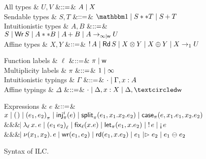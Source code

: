 \begin{figure*}[t]
  \centering
  \begin{minipage}{.58\textwidth}
    \centering
    \begin{grammar}
        All types
      & $U, V$
        &$\bnfas$& $A \bnfalt X$
      \\
      Sendable types
      & $S, T$
      &$\bnfas$& $\tyUnit \bnfalt S ** T \bnfalt \tySum{S}{}{T}$
      \\
      Intuitionistic types
      & $A,B$
      &$\bnfas$& $S \bnfalt \tyWr{S} \bnfalt A ** B \bnfalt \tySum{A}{}{B}
      \bnfalt \tyArr{A}{\infty \mid \wm}{U}$
      \\
      Affine types
      & $X,Y$
      &$\bnfas$& $\tyBang{A} \bnfalt \tyRd{S} \bnfalt \tyTensor{X}{Y} \bnfalt
      \tyOplus{X}{Y} \bnfalt \tyArr{X}{1}{U}$
    \end{grammar}      
  \end{minipage}%
  \begin{minipage}{.42\textwidth}
    \centering
    \begin{grammar}
      Function labels
      & $\ell$
      &$\bnfas$& $\pi \bnfalt \wm$      
      \\      
      Multiplicity labels
      & $\pi$
      &$\bnfas$& $1 \bnfalt \infty$      
      \\
      Intuitionistic typings
      & $\Gamma$
      &$\bnfas$& $\emptyctxt \bnfalt \Gamma,x:A$
      \\
      Affine typings
      & $\Delta$
      &$\bnfas$& $\emptyctxt \bnfalt \Delta,x:X \bnfalt \Delta, \wrtok$
    \end{grammar}    
  \end{minipage}
  \begin{grammar}
    Expressions
    & $e$
    &$\bnfas$&
    $\eVar{x} \bnfalt \eUnit \bnfalt \ePair{e_1}{e_2}{\pi} \bnfalt \eInj{i}{e}
    \bnfalt \eSplit{e_1}{x_1}{x_2}{e_2} \bnfalt
    \eCase{\pi}{e}{x_1}{e_1}{x_2}{e_2}$
    \\ &&& $\bnfaltbrk \eLamm{\ell}{x}{e} \bnfalt \eApp{e_1}{e_2}{\ell} \bnfalt \eFixx{\ell}{x}{e}
    \bnfalt \eLet{x}{e_1}{e_2} \bnfalt \eBang{e} \bnfalt \eUnbang{e}$
    \\ &&& $\bnfaltbrk \eNu{(x_1,x_2)}{e} \bnfalt \eWr{e_1}{e_2} \bnfalt
    \eLetRd{e_1}{x}{e_2} \bnfalt \eFork{e_1}{e_2} \bnfalt \eChoice{e_1}{e_2}$
  \end{grammar}      
  \caption{Syntax of ILC.}
  \label{fig:ilc-syntax}
\end{figure*}
